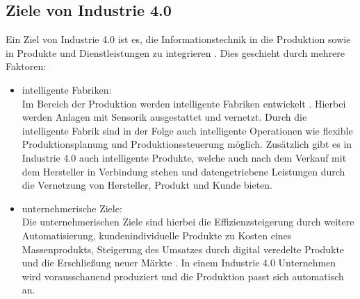 \subsection{Ziele von Industrie 4.0}
Ein Ziel von Industrie 4.0 ist es, die Informationstechnik in die Produktion sowie in Produkte und Dienstleistungen zu integrieren \parencite{reinhart2017handbuch}. Dies geschieht durch mehrere Faktoren: 

\begin{itemize}
\item intelligente Fabriken:\\
Im Bereich der Produktion werden intelligente Fabriken entwickelt \parencite{vogel2017handbuch}. Hierbei werden Anlagen mit Sensorik ausgestattet und vernetzt. Durch die intelligente Fabrik sind in der Folge auch intelligente Operationen wie flexible Produktionsplanung und Produktionssteuerung möglich. Zusätzlich gibt es in Industrie 4.0 auch intelligente Produkte, welche auch nach dem Verkauf mit dem Hersteller in Verbindung stehen und datengetriebene Leistungen durch die Vernetzung von Hersteller, Produkt und Kunde bieten.

\item unternehmerische Ziele:\\
Die unternehmerischen Ziele sind hierbei die Effizienzsteigerung durch weitere Automatisierung, kundenindividuelle Produkte zu Kosten eines Massenprodukts, Steigerung des Umsatzes durch digital veredelte Produkte und die Erschließung neuer Märkte \parencite{reinhart2017handbuch}. In einem Industrie 4.0 Unternehmen wird vorausschauend produziert und die Produktion passt sich automatisch an.
\end{itemize}
\vspace{\baselineskip}

